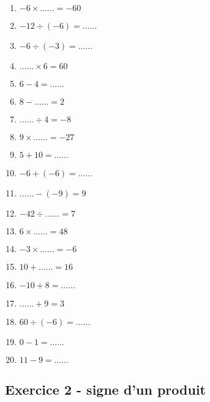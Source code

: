 \documentclass[11pt]{article}
\begin{document}
\begin{multicols}{3}\noindent
    \begin{enumerate}
        \item $-6 \times \ldots\ldots = -60$
        \item $-12 \div \left( -6\right) = \ldots\ldots$
        \item $-6 \div \left( -3\right) = \ldots\ldots$
        \item $\ldots\ldots \times 6 = 60$
        \item $6 - 4 = \ldots\ldots$
        \item $8 - \ldots\ldots = 2$
        \item $\ldots\ldots \div 4 = -8$
        \item $9 \times \ldots\ldots = -27$
        \item $5 + 10 = \ldots\ldots$
        \item $-6 + \left( -6\right) = \ldots\ldots$
        \item $\ldots\ldots - \left( -9\right) = 9$
        \item $-42 \div \ldots\ldots = 7$
        \item $6 \times \ldots\ldots = 48$
        \item $-3 \times \ldots\ldots = -6$
        \item $10 + \ldots\ldots = 16$
        \item $-10 + 8 = \ldots\ldots$
        \item $\ldots\ldots + 9 = 3$
        \item $60 \div \left( -6\right) = \ldots\ldots$
        \item $0 - 1 = \ldots\ldots$
        \item $11 - 9 = \ldots\ldots$
    \end{enumerate}
  \end{multicols}

\subsection*{Exercice 2 - signe d'un produit}
\end{document}
